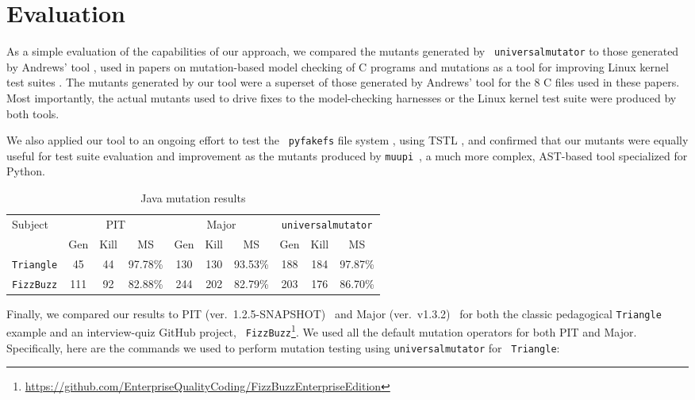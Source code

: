 \section{Evaluation}

As a simple evaluation of the capabilities of our approach, we compared the mutants generated by {\tt
  universalmutator} to those generated by Andrews' tool \cite{mutant},
used in papers on mutation-based model checking of C programs
\cite{ASE15} and mutations as a tool for improving Linux kernel test
suites \cite{mutation17}.  The mutants generated by our tool were a
superset of those generated by Andrews' tool for the 8 C files used in
these papers.  Most importantly, the actual mutants used to drive
fixes to the model-checking harnesses or the Linux kernel test suite
were produced by both tools.

We also applied our tool to an ongoing effort to test the {\tt
  pyfakefs} file system \cite{pyfakefs}, using TSTL \cite{nfm15,tstlsttt},
and confirmed that our mutants were equally useful for test suite
evaluation and improvement as the mutants produced by {\tt muupi}~\cite{muupi},
a much more complex, AST-based tool specialized for Python.
\begin{table}[t!]
  \footnotesize
  \caption{\label{tab:java} Java mutation results}
  \begin{tabular}{|l|ccc|ccc|ccc|}
    \hline
    Subject&\multicolumn{3}{c|}{PIT}&\multicolumn{3}{c|}{Major}&\multicolumn{3}{c|}{{\tt universalmutator}}\\
    &Gen&Kill&MS&Gen&Kill&MS&Gen&Kill&MS\\\hline
\hline
    {\tt Triangle}&45&44&97.78\%&130&130&93.53\%&188&184&97.87\%\\
{\tt FizzBuzz}&111&92&82.88\%&244&202&82.79\%&203&176&86.70\%\\
  \hline\end{tabular}
  \end{table}

Finally, we compared our results to PIT (ver.\ 1.2.5-SNAPSHOT)~\cite{pittest}
and Major (ver.\ v1.3.2)~\cite{major} for both the
classic pedagogical {\tt Triangle} example and an interview-quiz GitHub project, {\tt
  FizzBuzz}\footnote{\url{https://github.com/EnterpriseQualityCoding/FizzBuzzEnterpriseEdition}
}.  We used all the default mutation operators for both
PIT and Major. Specifically, here are the commands we used to
perform mutation testing using {\tt universalmutator} for {\tt
  Triangle}:

